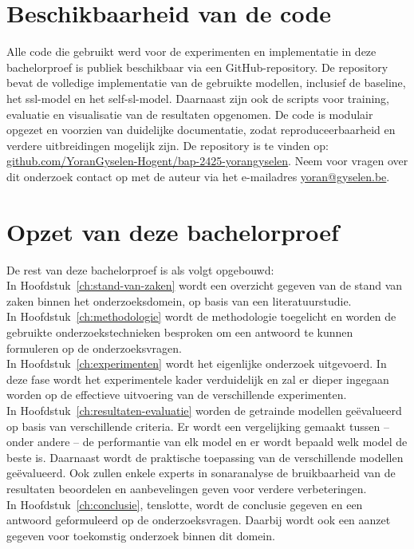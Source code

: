\section{Beschikbaarheid van de code}

Alle code die gebruikt werd voor de experimenten en implementatie in deze bachelorproef is publiek beschikbaar via een GitHub-repository. De repository bevat de volledige implementatie van de gebruikte modellen, inclusief de baseline, het \gls{ssl}-model en het \gls{self-sl}-model. Daarnaast zijn ook de scripts voor training, evaluatie en visualisatie van de resultaten opgenomen. De code is modulair opgezet en voorzien van duidelijke documentatie, zodat reproduceerbaarheid en verdere uitbreidingen mogelijk zijn. De repository is te vinden op: \href{https://github.com/YoranGyselen-Hogent/bap-2425-yorangyselen}{github.com/YoranGyselen-Hogent/bap-2425-yorangyselen}. Neem voor vragen over dit onderzoek contact op met de auteur via het e-mailadres \href{mailto:yoran@gyselen.be}{yoran@gyselen.be}.

\section{Opzet van deze bachelorproef}%
\label{sec:opzet-bachelorproef}

De rest van deze bachelorproef is als volgt opgebouwd: \\

In Hoofdstuk~\ref{ch:stand-van-zaken} wordt een overzicht gegeven van de stand van zaken binnen het onderzoeksdomein, op basis van een literatuurstudie. \\

In Hoofdstuk~\ref{ch:methodologie} wordt de methodologie toegelicht en worden de gebruikte onderzoekstechnieken besproken om een antwoord te kunnen formuleren op de onderzoeksvragen. \\

In Hoofdstuk~\ref{ch:experimenten} wordt het eigenlijke onderzoek uitgevoerd. In deze fase wordt het experimentele kader verduidelijk en zal er dieper ingegaan worden op de effectieve uitvoering van de verschillende experimenten. \\

In Hoofdstuk~\ref{ch:resultaten-evaluatie} worden de getrainde modellen geëvalueerd op basis van verschillende criteria. Er wordt een vergelijking gemaakt tussen -- onder andere -- de performantie van elk model en er wordt bepaald welk model de beste is. Daarnaast wordt de praktische toepassing van de verschillende modellen geëvalueerd. Ook zullen enkele experts in sonaranalyse de bruikbaarheid van de resultaten beoordelen en aanbevelingen geven voor verdere verbeteringen. \\

In Hoofdstuk~\ref{ch:conclusie}, tenslotte, wordt de conclusie gegeven en een antwoord geformuleerd op de onderzoeksvragen. Daarbij wordt ook een aanzet gegeven voor toekomstig onderzoek binnen dit domein.